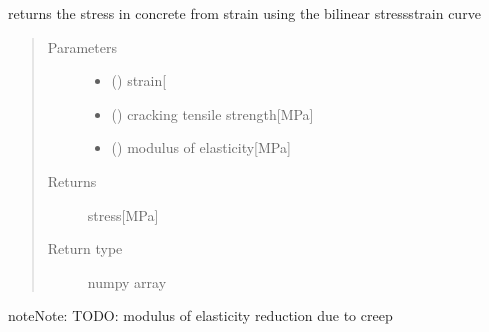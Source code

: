 \documentclass[letterpaper,10pt,english]{sphinxmanual}
\begin{document}

\begin{fulllineitems}
\label{\detokenize{cracking:cracking.bilinear_stress_strain}}
\sphinxAtStartPar
returns the stress in concrete from strain using the bilinear stress\sphinxhyphen{}strain curve
\begin{quote}\begin{description}
\item[{Parameters}] \leavevmode\begin{itemize}
\item {} 
\sphinxAtStartPar
{} () \textendash{} strain{[}\sphinxhyphen{}{]}

\item {} 
\sphinxAtStartPar
{} () \textendash{} cracking tensile strength{[}MPa{]}

\item {} 
\sphinxAtStartPar
{} () \textendash{} modulus of elasticity{[}MPa{]}

\end{itemize}

\item[{Returns}] \leavevmode
\sphinxAtStartPar
stress{[}MPa{]}

\item[{Return type}] \leavevmode
\sphinxAtStartPar
numpy array

\end{description}\end{quote}

\begin{sphinxadmonition}{note}{Note:}
\sphinxAtStartPar
TODO: modulus of elasticity reduction due to creep
\end{sphinxadmonition}

\end{fulllineitems}

\end{document}
